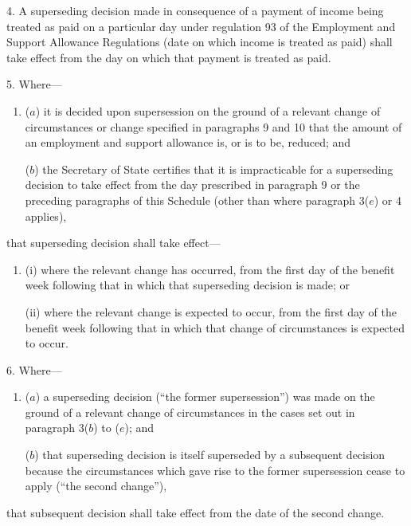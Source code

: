 \documentclass[12pt,a4paper]{article}
\begin{document}

\medskip

4.  A superseding decision made in consequence of a payment of income being treated as paid on a particular day under regulation 93 of the Employment and Support Allowance Regulations (date on which income is treated as paid) shall take effect from the day on which that payment is treated as paid.

\medskip

5.  Where—
\begin{enumerate}\item[]
($a$) it is decided upon supersession on the ground of a relevant change of circumstances or change specified in paragraphs 9 and 10 that the amount of an employment and support allowance is, or is to be, reduced; and

($b$) the Secretary of State certifies that it is impracticable for a superseding decision to take effect from the day prescribed in paragraph 9 or the preceding paragraphs of this Schedule (other than where paragraph 3($e$)  or 4 applies),
\end{enumerate}
that superseding decision shall take effect—
\begin{enumerate}\item[]
(i) where the relevant change has occurred, from the first day of the benefit week following that in which that superseding decision is made; or

(ii) where the relevant change is expected to occur, from the first day of the benefit week following that in which that change of circumstances is expected to occur.
\end{enumerate}

\medskip

6.  Where—
\begin{enumerate}\item[]
($a$) a superseding decision (“the former supersession”) was made on the ground of a relevant change of circumstances in the cases set out in paragraph 3($b$)  to ($e$); and

($b$) that superseding decision is itself superseded by a subsequent decision because the circumstances which gave rise to the former supersession cease to apply (“the second change”),
\end{enumerate}
that subsequent decision shall take effect from the date of the second change.
\end{document}
